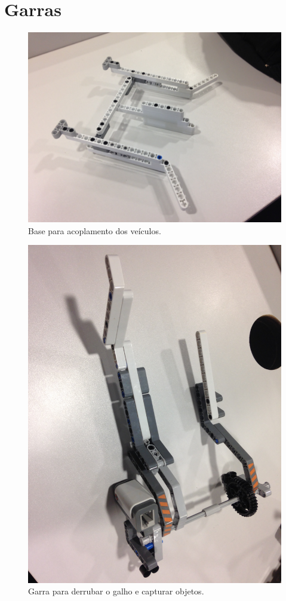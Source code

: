 \documentclass{article}
\begin{document}
\section{Garras}
	\begin{figure}[h!]
		\includegraphics[width=\linewidth]{../Images/claw_1.JPG}
		\caption{Base para acoplamento dos veículos.}
		\label{fig:claw_1}
	\end{figure}

	\begin{figure}[h!]
		\includegraphics[width=\linewidth]{../Images/claw_2.JPG}
		\caption{Garra para derrubar o galho e capturar objetos.}
		\label{fig:claw_2}
	\end{figure}
\end{document}
